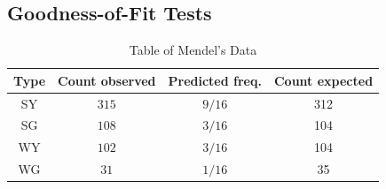 \documentclass[../Main.tex]{subfiles}
\begin{document}
\subsection{Goodness-of-Fit Tests}
\begin{table}
    \centering
    \begin{tabular}{|c|c|c|c|}
        \hline
        Type & Count observed & Predicted freq. & Count expected \\
        \hline
        SY & $315$ & $9 / 16$ & 312 \\
        SG & $108$ & $3 / 16$ & 104 \\
        WY & $102$ & $3 / 16$ & 104 \\
        WG & $31$ & $1 / 16$ & 35 \\
        \hline
    \end{tabular}
    \caption{Table of Mendel's Data}
    \label{tabMendelExperiment}
\end{table}
\end{document}
